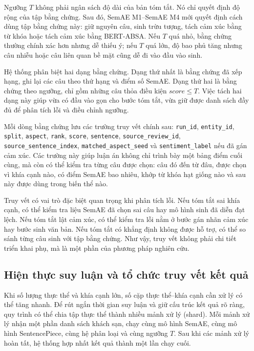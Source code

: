 Ngưỡng \(T\) không phải ngân sách độ dài của bản tóm tắt. Nó chỉ quyết định độ rộng của tập bằng chứng. Sau đó, SemAE M1--SemAE M4 mới quyết định cách dùng tập bằng chứng này: giữ nguyên câu, sinh trừu tượng, tách cảm xúc bằng từ khóa hoặc tách cảm xúc bằng BERT-ABSA. Nếu \(T\) quá nhỏ, bằng chứng thường chính xác hơn nhưng dễ thiếu ý; nếu \(T\) quá lớn, độ bao phủ tăng nhưng câu nhiễu hoặc câu liên quan bề mặt cũng dễ đi vào đầu vào sinh.

Hệ thống phân biệt hai dạng bằng chứng. Dạng thứ nhất là bằng chứng đã xếp hạng, ghi lại các câu theo thứ hạng và điểm số SemAE. Dạng thứ hai là bằng chứng theo ngưỡng, chỉ gồm những câu thỏa điều kiện \(score \leq T\). Việc tách hai dạng này giúp vừa có đầu vào gọn cho bước tóm tắt, vừa giữ được danh sách đầy đủ để phân tích lỗi và điều chỉnh ngưỡng.

Mỗi dòng bằng chứng lưu các trường truy vết chính sau: \texttt{run\_id}, \texttt{entity\_id}, \texttt{split}, \texttt{aspect}, \texttt{rank}, \texttt{score}, \texttt{sentence}, \texttt{source\_review\_id}, \texttt{source\_sentence\_index}, \texttt{matched\_aspect\_seed} và \texttt{sentiment\_label} nếu đã gán cảm xúc. Các trường này giúp luận án không chỉ trình bày một bảng điểm cuối cùng, mà còn có thể kiểm tra từng câu được chọn: câu đó đến từ đâu, được chọn vì khía cạnh nào, có điểm SemAE bao nhiêu, khớp từ khóa hạt giống nào và sau này được dùng trong biến thể nào.

Truy vết có vai trò đặc biệt quan trọng khi phân tích lỗi. Nếu tóm tắt sai khía cạnh, có thể kiểm tra liệu SemAE đã chọn sai câu hay mô hình sinh đã diễn đạt lệch. Nếu tóm tắt lật cảm xúc, có thể kiểm tra lỗi nằm ở bước gán nhãn cảm xúc hay bước sinh văn bản. Nếu tóm tắt có khẳng định không được hỗ trợ, có thể so sánh từng câu sinh với tập bằng chứng. Như vậy, truy vết không phải chi tiết triển khai phụ, mà là một phần của phương pháp nghiên cứu.

\subsection{Hiện thực suy luận và tổ chức truy vết kết quả}
\label{subsec:method2-sharded-inference}

Khi số lượng thực thể và khía cạnh lớn, số cặp thực thể--khía cạnh cần xử lý có thể tăng nhanh. Để rút ngắn thời gian suy luận và giữ cấu trúc kết quả rõ ràng, quy trình có thể chia tập thực thể thành nhiều mảnh xử lý (shard). Mỗi mảnh xử lý nhận một phần danh sách khách sạn, chạy cùng mô hình SemAE, cùng mô hình SentencePiece, cùng hệ phân loại và cùng ngưỡng \(T\). Sau khi các mảnh xử lý hoàn tất, hệ thống hợp nhất kết quả thành một lần chạy cuối.

